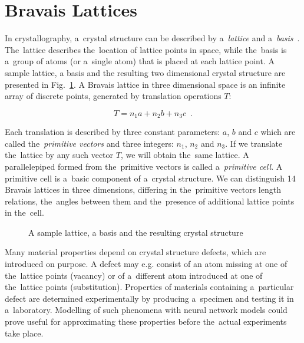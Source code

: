 \documentclass{llncs}
\begin{document}
\section{Bravais Lattices}
In crystallography, a~crystal structure can be described by a~\emph{lattice} and a~\emph{basis}~\cite{kittel1986introduction}. The~lattice describes the~location of lattice points in space, while the~basis is a~group of atoms (or a~single atom) that is placed at each lattice point. A sample lattice, a basis and the resulting two dimensional crystal structure are presented in Fig.~\ref{fig:lattice}. A Bravais lattice in three dimensional space is an infinite array of discrete points, generated by translation operations $T$:

\begin{equation}
T = n_1a + n_2b + n_3c \enspace .
\end{equation}

\noindent Each translation is described by three constant parameters: $a$, $b$ and $c$ which are called the~\emph{primitive vectors} and three integers: $n_1$, $n_2$ and $n_3$. If we translate the~lattice by any such vector $T$, we will obtain the~same lattice. A parallelepiped formed from the~primitive vectors is called a~\emph{primitive cell}. A primitive cell is a~basic component of a~crystal structure. We can distinguish 14 Bravais lattices in three dimensions, differing in the~primitive vectors length relations, the~angles between them and the~presence of additional lattice points in the~cell.
\\


\begin{figure}[h!]
\begin{center}
	\caption[]{A sample lattice, a basis and the resulting crystal structure}
	\label{fig:lattice}
\end{center}
\end{figure}


\noindent Many material properties depend on crystal structure defects, which are introduced on purpose. A defect may e.g. consist of an atom missing at one of the~lattice points (vacancy) or of a~different atom introduced at one of the~lattice points (substitution). Properties of materials containing a~particular defect are determined experimentally by producing a~specimen and testing it in a~laboratory. Modelling of such phenomena with neural network models could prove useful for approximating these properties before the~actual experiments take place.
\end{document}
